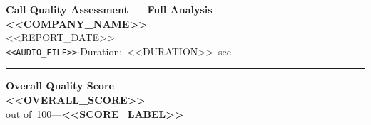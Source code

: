 \documentclass[12pt,a4paper]{article}
\begin{document}
\begin{center}
  {\fontsize{20}{26}\selectfont\textbf{\textcolor{accent}{Call Quality Assessment — Full Analysis}}}\\[0.5em]
  {\large\textbf{<<COMPANY_NAME>>}}\\[0.25em]
  {\normalsize <<REPORT_DATE>>}\\[0.15em]
  {\small\texttt{<<AUDIO_FILE>>}\quad$\cdot$\quad Duration:~<<DURATION>>~sec}
\end{center}

\vspace{0.6em}
\noindent\textcolor{accent}{\rule{\textwidth}{1.2pt}}
\vspace{0.8em}

\begin{center}
  \colorbox{gray!10}{%
    \begin{minipage}{0.58\textwidth}
      \centering\vspace{0.7em}
      {\large\textbf{Overall Quality Score}}\\[0.5em]
      {\fontsize{54}{62}\selectfont\textcolor{<<SCORE_COLOR>>}{\textbf{<<OVERALL_SCORE>>}}}\\[0.2em]
      {\normalsize out of~100\quad---\quad\textbf{<<SCORE_LABEL>>}}\\[0.7em]
    \end{minipage}%
  }
\end{center}

\vspace{1em}
\end{document}
